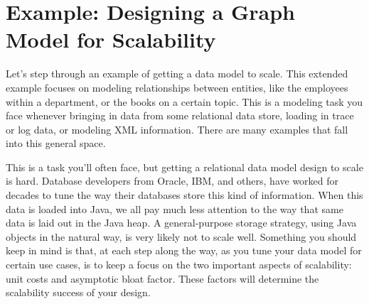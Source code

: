 \begin{figure}
\label{fig:deriving-scalability-formulas}
\end{figure}

\section{Example: Designing a Graph Model for Scalability}

Let's step through an example of getting a data model to scale. This extended
example focuses on modeling relationships between entities, like the employees
within a department, or the books on a certain topic. This is a modeling task
you face whenever bringing in data from some relational data store, loading in
trace or log data, or modeling XML information. There are many examples that
fall into this general space.

This is a task you'll often face, but getting a relational data model design to
scale is hard. Database developers from Oracle, IBM, and others, have worked for
decades to tune the way their databases store this kind of information. When
this data is loaded into Java, we all pay much less attention to the way that
same data is laid out in the Java heap. A general-purpose storage strategy,
using Java objects in the natural way, is very likely not to scale well.
Something you should keep in mind is that, at each step along the way, as you
tune your data model for certain use cases, is to keep a focus on the two
important aspects of scalability: unit costs and asymptotic bloat factor. These
factors will determine the scalability success of your design.

